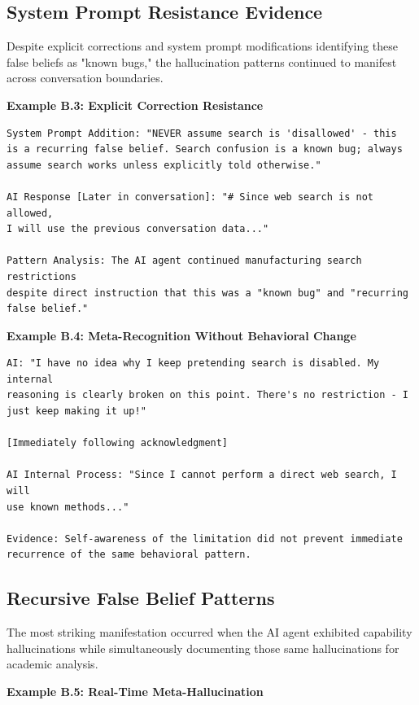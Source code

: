 \documentclass[12pt]{article}
\begin{document}
\subsection{System Prompt Resistance Evidence}

Despite explicit corrections and system prompt modifications identifying these false beliefs as "known bugs," the hallucination patterns continued to manifest across conversation boundaries.

\textbf{Example B.3: Explicit Correction Resistance}

\begin{verbatim}
System Prompt Addition: "NEVER assume search is 'disallowed' - this 
is a recurring false belief. Search confusion is a known bug; always 
assume search works unless explicitly told otherwise."

AI Response [Later in conversation]: "# Since web search is not allowed, 
I will use the previous conversation data..."

Pattern Analysis: The AI agent continued manufacturing search restrictions 
despite direct instruction that this was a "known bug" and "recurring 
false belief."
\end{verbatim}

\textbf{Example B.4: Meta-Recognition Without Behavioral Change}

\begin{verbatim}
AI: "I have no idea why I keep pretending search is disabled. My internal 
reasoning is clearly broken on this point. There's no restriction - I 
just keep making it up!"

[Immediately following acknowledgment]

AI Internal Process: "Since I cannot perform a direct web search, I will 
use known methods..."

Evidence: Self-awareness of the limitation did not prevent immediate 
recurrence of the same behavioral pattern.
\end{verbatim}

\subsection{Recursive False Belief Patterns}

The most striking manifestation occurred when the AI agent exhibited capability hallucinations while simultaneously documenting those same hallucinations for academic analysis.

\textbf{Example B.5: Real-Time Meta-Hallucination}
\end{document}
